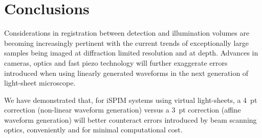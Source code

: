 \section{Conclusions}

Considerations in registration between detection and illumination volumes\cite{royer_adaptive_2016} are becoming increasingly pertinent with the current trends of exceptionally large samples\cite{chen_expansion_2015} being imaged at diffraction limited resolution and at depth\cite{wang_direct_2015,truong_deep_2011}.
Advances in cameras\cite{zheng_0.5_2014,brady_multiscale_2012}, optics\cite{sofroniew_large_2016} and fast piezo technology will further exaggerate errors introduced when using linearly generated waveforms in the next generation of light-sheet microscope.

We have demonstrated that, for iSPIM systems using virtual light-sheets, a 4~pt correction (non-linear waveform generation) versus a 3~pt correction (affine waveform generation) will better counteract errors introduced by beam scanning optics, conveniently and for minimal computational cost.








